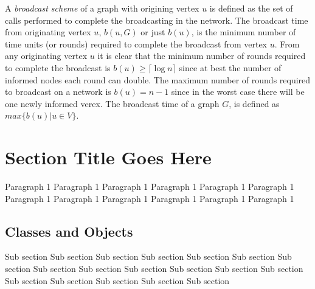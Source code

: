 A \textit{broadcast scheme} of a graph with origining vertex $u$ is defined as the set of calls performed to complete the broadcasting in the network. The broadcast time from originating vertex $u$, $b(u,G)$ or just $b(u)$, is the minimum number of time units (or rounds) required to complete the broadcast from vertex $u$. From any originating vertex $u$ it is clear that the minimum number of rounds required to complete the broadcast is $b(u) \geq \lceil\log n\rceil$ since at best the number of informed nodes each round can double. The maximum number of rounds required to broadcast on a network is $b(u) = n - 1$ since in the worst case there will be one newly informed verex. The broadcast time of a graph $G$, is defined as $max\{b(u) | u \in V\}$.




\section{Section Title Goes Here}

Paragraph 1 Paragraph 1 Paragraph 1 Paragraph 1 Paragraph 1 Paragraph 1 Paragraph 1 Paragraph 1 Paragraph 1 Paragraph 1 Paragraph 1 Paragraph 1

\subsection{Classes and Objects}

Sub section Sub section Sub section Sub section Sub section Sub section Sub section Sub section Sub section Sub section Sub section Sub section Sub section Sub section Sub section Sub section Sub section Sub section
